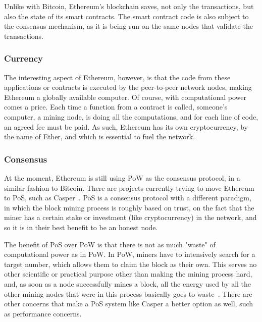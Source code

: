 Unlike with Bitcoin, Ethereum's blockchain saves, not only the transactions, but also the state of its smart contracts. The smart contract code is also subject to the consensus mechanism, as it is being run on the same nodes that validate the transactions.


\subsubsection{Currency}

The interesting aspect of Ethereum, however, is that the code from these applications or contracts is executed by the peer-to-peer network nodes, making Ethereum a globally available computer. Of course, with computational power comes a price. Each time a function from a contract is called, someone's computer, a mining node, is doing all the computations, and for each line of code, an agreed fee must be paid. As such, Ethereum has its own cryptocurrency, by the name of Ether, and which is essential to fuel the network.

\subsubsection{Consensus}

At the moment, Ethereum is still using PoW as the consensus protocol, in a similar fashion to Bitcoin. There are projects currently trying to move Ethereum to PoS, such as Casper~\cite{Buterin2017}. PoS is a consensus protocol with a different paradigm, in which the block mining process is roughly based on trust, on the fact that the miner has a certain stake or investment (like cryptocurrency) in the network, and so it is in their best benefit to be an honest node. 

The benefit of PoS over PoW is that there is not as much "waste" of computational power as in PoW. In PoW, miners have to intensively search for a target number, which allows them to claim the block as their own. This serves no other scientific or practical purpose other than making the mining process hard, and, as soon as a node successfully mines a block, all the energy used  by all the other mining nodes that were in this process basically goes to waste~\cite{Buterin2013}. There are other concerns that make a PoS system like Casper a better option as well, such as performance concerns. 

